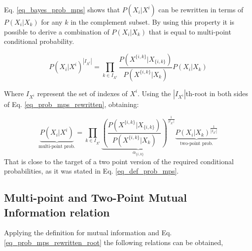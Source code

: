 Eq. \eqref{eq_bayes_prob_mps} shows that $P(X_{ i }|X^{ i })$ can be rewritten in terms of $P(X_{ i }|X_{ k })$ for any $k$ in the complement subset. By using this property it is possible to derive a combination of $P(X_{ i }|X_{ k })$ that is equal to multi-point conditional probability.

\begin{equation}\label{eq_prob_mps_rewritten}
	P(X_{ i } |X^{ i })^{|I_{X^{ i }}|} = \prod_{k \in I_{X^{ i }}}{\frac{P(X^{ \{i,k\} }|X_{ \{i,k\} })}{P(X^{ \{i,k\} }|X_{ k })}P(X_{ i }|X_{ k })}
\end{equation}

Where $I_{X^{ i }}$ represent the set of indexes of $X^{ i }$. Using the $|I_{X^{ i }}|$th-root in both sides of Eq. \eqref{eq_prob_mps_rewritten}, obtaining:

\begin{equation}\label{eq_prob_mps_rewritten_root}
	\underbrace{P(X_{ i } |X^{ i })}_{\text{multi-point prob.}} = \prod_{k \in I_{X^{ i }}}{\underbrace{\left(\frac{P(X^{ \{i,k\} }|X_{ \{i,k\} })}{P(X^{ \{i,k\} }|X_{ k })} \right)^{\frac{1}{\vert I_{X^{ i }} \vert}}}_{\alpha_{ \{i,k\} }} \underbrace{{P(X_{ i }|X_{ k })}^{\frac{1}{|I_{X^{ i }}|}}}_{\text{two-point prob.}}}
\end{equation} 
%
%
That is close to the target of a two point version of the required conditional probabilities, as it was stated in Eq. \eqref{eq_def_prob_mps}.

\subsection{Multi-point and Two-Point Mutual Information relation}

Applying the definition for mutual information and Eq. \eqref{eq_prob_mps_rewritten_root} the following relations can be obtained,

